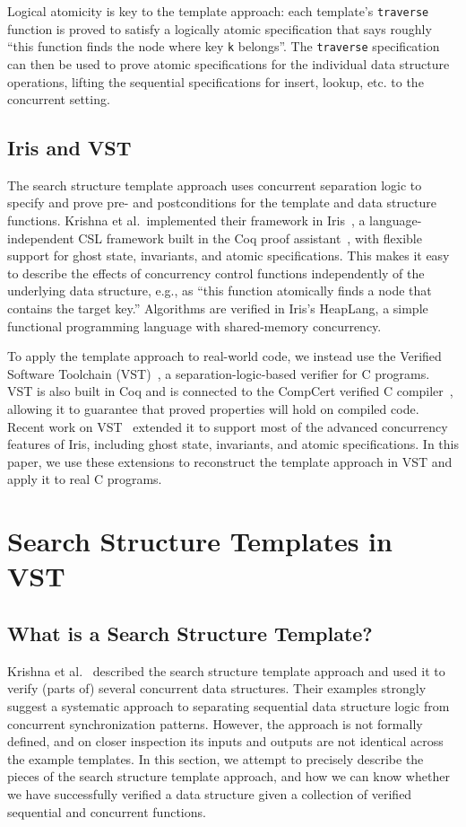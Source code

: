 \documentclass[sigplan,screen]{acmart}
\begin{document}
Logical atomicity is key to the template approach: each template's \lstinline{traverse} function is proved to satisfy a logically atomic specification that says roughly ``this function finds the node where key \lstinline{k} belongs''. The \lstinline{traverse} specification can then be used to prove atomic specifications for the individual data structure operations, lifting the sequential specifications for insert, lookup, etc. to the concurrent setting.

\subsection{Iris and VST}
The search structure template approach uses concurrent separation logic to specify and prove pre- and postconditions for the template and data structure functions. Krishna et al.~implemented their framework in Iris~\cite{iris}, a language-independent CSL framework built in the Coq proof assistant~\cite{coq}, with flexible support for ghost state, invariants, and atomic specifications. This makes it easy to describe the effects of concurrency control functions independently of the underlying data structure, e.g., as ``this function atomically finds a node that contains the target key.'' %
Algorithms are verified in Iris's HeapLang, a simple functional programming language with shared-memory concurrency.

To apply the template approach to real-world code, we instead use the Verified Software Toolchain (VST)~\cite{plcc}, a separation-logic-based verifier for C programs. VST is also built in Coq and is connected to the CompCert verified C compiler~\cite{compcert}, allowing it to guarantee that proved properties will hold on compiled code. Recent work on VST~\cite{iris-vst-arxiv} extended it to support most of the advanced concurrency features of Iris, including ghost state, invariants, and atomic specifications. In this paper, we use these extensions to reconstruct the template approach in VST and apply it to real C programs. %

\section{Search Structure Templates in VST}

\subsection{What is a Search Structure Template?}
Krishna et al.~\cite{templates} described the search structure template approach and used it to verify (parts of) several concurrent data structures. Their examples strongly suggest a systematic approach to separating sequential data structure logic from concurrent synchronization patterns. However, the approach is not formally defined, and on closer inspection its inputs and outputs are not identical across the example templates. In this section, we attempt to precisely describe the pieces of the search structure template approach, and how we can know whether we have successfully verified a data structure given a collection of verified sequential and concurrent functions.
\end{document}
